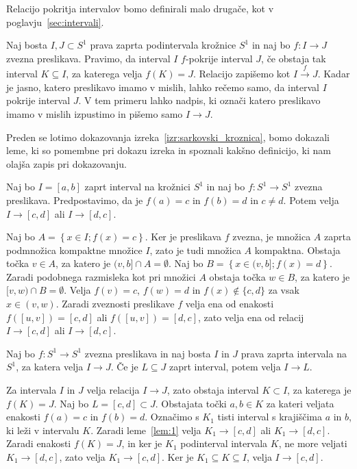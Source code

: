 \documentclass[../TG_magistrsko_delo_sections.tex]{subfiles}
\begin{document}
Relacijo pokritja intervalov bomo definirali malo drugače, kot v poglavju~\ref{sec:intervali}.

\begin{definicija}\label{def:pokritja}
Naj bosta $I, J \subset S^1$ prava zaprta podintervala krožnice $S^1$ in naj bo $f: I \to J$ zvezna preslikava. Pravimo, da interval $I$ $f$-pokrije interval $J$, če obstaja tak interval $K \subseteq I$, za katerega velja $f(K) = J$. Relacijo zapišemo kot $I \xrightarrow{f} J$. Kadar je jasno, katero preslikavo imamo v mislih, lahko rečemo samo, da interval $I$ pokrije interval $J$. V tem primeru lahko nadpis, ki označi katero preslikavo imamo v mislih izpustimo in pišemo samo $I \to J$.
\end{definicija}

Preden se lotimo dokazovanja izreka~\ref{izr:sarkovski_kroznica}, bomo dokazali leme, ki so pomembne pri dokazu izreka in spoznali kakšno definicijo, ki nam olajša zapis pri dokazovanju.

\begin{lema}\label{lem:1}					%
Naj bo $I=[a, b]$ zaprt interval na krožnici $S^1$ in naj bo $f : S^1 \to S^1$ zvezna preslikava. Predpostavimo, da je $f(a) = c$ in $f(b) =d$ in $c \neq d$. Potem velja $I \to [c, d]$ ali $I \to [d, c]$.
\end{lema}

\begin{dokaz}
Naj bo $A = \left\{x \in I; f(x) = c \right\}$. Ker je preslikava $f$ zvezna, je množica $A$ zaprta podmnožica kompaktne množice $I$, zato je tudi množica $A$ kompaktna. Obstaja točka $v \in A$, za katero je $(v, b] \cap A = \emptyset$. Naj bo $B = \left\{x \in (v,b]; f(x) = d \right\}$. Zaradi podobnega razmisleka kot pri množici $A$ obstaja točka $w \in B$, za katero je $[v, w) \cap B = \emptyset$. Velja $f(v) = c$, $f(w)=d$ in $f(x) \notin \{c, d\}$ za vsak $x \in (v, w)$. Zaradi zveznosti preslikave $f$ velja ena od enakosti $f([u, v]) = [c, d]$ ali $f([u, v]) = [d, c]$, zato velja ena od relacij $I \to [c, d]$ ali $I \to [d, c]$.
\end{dokaz}

\begin{lema}\label{lem:2}		%
Naj bo $f : S^1 \to S^1$ zvezna preslikava in naj bosta $I$ in $J$ prava zaprta intervala na $S^1$, za katera velja $I \to J$. Če je $L \subseteq J$ zaprt interval, potem velja $I \to L$.
\end{lema}

\begin{dokaz}
Za intervala $I$ in $J$ velja relacija $I \to J$, zato obstaja interval $K \subset I$, za katerega je $f(K) = J$. Naj bo $L = [c, d]  \subset J$. Obstajata točki $a, b \in K$ za kateri veljata enakosti $f(a) = c$ in $f(b)=d$. Označimo s $K_1$ tisti interval s krajiščima $a$ in $b$, ki leži v intervalu $K$. Zaradi leme~\ref{lem:1} velja $K_1 \to [c, d]$ ali $K_1 \to [d, c]$. Zaradi enakosti $f(K) = J$, in ker je $K_1$ podinterval intervala $K$, ne more veljati $K_1 \to [d, c]$, zato velja $K_1 \to [c, d]$. Ker je $K_1 \subseteq K \subseteq I$, velja $I \to [c, d]$.
\end{dokaz}
\end{document}
